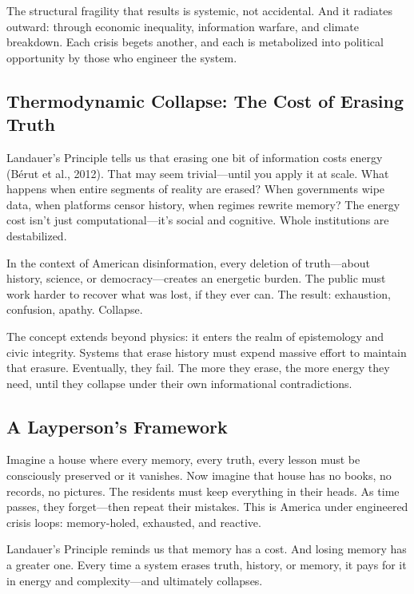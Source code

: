The structural fragility that results is systemic, not accidental. And
it radiates outward: through economic inequality, information warfare,
and climate breakdown. Each crisis begets another, and each is
metabolized into political opportunity by those who engineer the system.

\subsection{Thermodynamic Collapse: The Cost of Erasing
Truth}\label{thermodynamic-collapse-the-cost-of-erasing-truth}

Landauer's Principle tells us that erasing one bit of information costs
energy (Bérut et al., 2012). That may seem trivial---until you apply it
at scale. What happens when entire segments of reality are erased? When
governments wipe data, when platforms censor history, when regimes
rewrite memory? The energy cost isn't just computational---it's social
and cognitive. Whole institutions are destabilized.

In the context of American disinformation, every deletion of
truth---about history, science, or democracy---creates an energetic
burden. The public must work harder to recover what was lost, if they
ever can. The result: exhaustion, confusion, apathy. Collapse.

The concept extends beyond physics: it enters the realm of epistemology
and civic integrity. Systems that erase history must expend massive
effort to maintain that erasure. Eventually, they fail. The more they
erase, the more energy they need, until they collapse under their own
informational contradictions.

\subsection{A Layperson's Framework}\label{a-laypersons-framework}

Imagine a house where every memory, every truth, every lesson must be
consciously preserved or it vanishes. Now imagine that house has no
books, no records, no pictures. The residents must keep everything in
their heads. As time passes, they forget---then repeat their mistakes.
This is America under engineered crisis loops: memory-holed, exhausted,
and reactive.

Landauer's Principle reminds us that memory has a cost. And losing
memory has a greater one. Every time a system erases truth, history, or
memory, it pays for it in energy and complexity---and ultimately
collapses.

